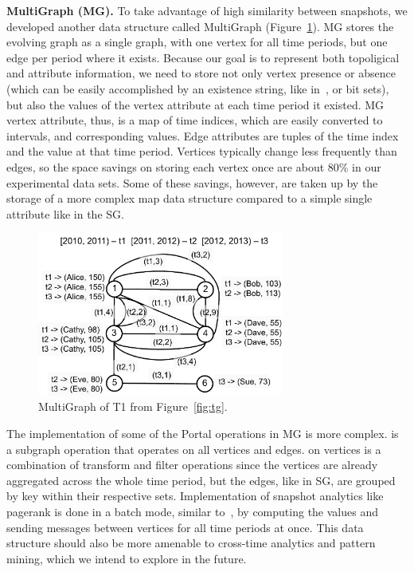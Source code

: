 {\bf MultiGraph (MG).}  To take advantage of high similarity between
snapshots, we developed another data structure called MultiGraph
(Figure~\ref{fig:mg}).  MG stores the evolving graph as a single
graph, with one vertex for all time periods, but one edge per period
where it exists.  Because our goal is to represent both topoligical
and attribute information, we need to store not only vertex presence
or absence (which can be easily accomplished by an existence string,
like in~\cite{Kan2009}, or bit sets), but also the values of the
vertex attribute at each time period it existed.  MG vertex attribute,
thus, is a map of time indices, which are easily converted to
intervals, and corresponding values.  Edge attributes are tuples of
the time index and the value at that time period.  Vertices typically
change less frequently than edges, so the space savings on storing
each vertex once are about 80\% in our experimental data sets.  Some
of these savings, however, are taken up by the storage of a more
complex map data structure compared to a simple single attribute like
in the SG.  

\begin{figure}[t!]
\includegraphics[width=3.2in]{figs/mg.pdf}
\caption{MultiGraph of T1 from Figure~\ref{fig:tg}.}
\label{fig:mg}
\end{figure}

The implementation of some of the Portal operations in MG is more
complex.   is a subgraph operation that operates on all
vertices and edges.   on vertices is a combination of
transform and filter operations since the vertices are already
aggregated across the whole time period, but the edges, like in SG,
are grouped by key within their respective sets.  Implementation of
snapshot analytics like pagerank is done in a batch mode, similar
to~\cite{DBLP:journals/tos/MiaoHLWYZPCC15}, by computing the values
and sending messages between vertices for all time periods at once.
This data structure should also be more amenable to cross-time
analytics and pattern mining, which we intend to explore in the
future.

